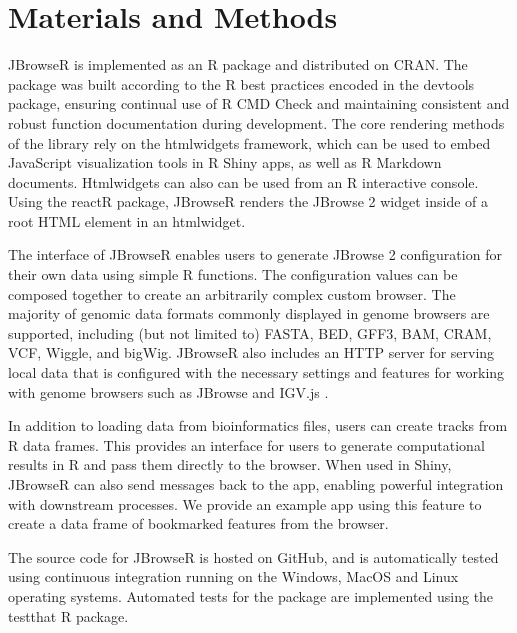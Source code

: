 \documentclass{bioinfo}
\begin{document}
\section{Materials and Methods}

JBrowseR is implemented as an R package and distributed on CRAN. The
package was built according to the R best practices encoded in the
devtools package, ensuring continual use of R CMD Check and maintaining
consistent and robust function documentation during development. The
core rendering methods of the library rely on the htmlwidgets framework,
which can be used to embed JavaScript visualization tools in R Shiny
apps, as well as R Markdown documents. Htmlwidgets can also can be used
from an R interactive console. Using the reactR package, JBrowseR
renders the JBrowse 2 widget inside of a root HTML element in an
htmlwidget.

The interface of JBrowseR enables users to generate JBrowse 2
configuration for their own data using simple R functions. The
configuration values can be composed together to create an arbitrarily
complex custom browser. The majority of genomic data formats commonly
displayed in genome browsers are supported, including (but not limited
to) FASTA, BED, GFF3, BAM, CRAM, VCF, Wiggle, and bigWig. JBrowseR also
includes an HTTP server for serving local data that is configured with
the necessary settings and features for working with genome browsers
such as JBrowse and IGV.js
\citep{robinson2011integrative, robinson2017variant}.

In addition to loading data from bioinformatics files, users can create
tracks from R data frames. This provides an interface for users to
generate computational results in R and pass them directly to the
browser. When used in Shiny, JBrowseR can also send messages back to the
app, enabling powerful integration with downstream processes. We provide
an example app using this feature to create a data frame of bookmarked
features from the browser.

The source code for JBrowseR is hosted on GitHub, and is automatically
tested using continuous integration running on the Windows, MacOS and
Linux operating systems. Automated tests for the package are implemented
using the testthat R package.
\end{document}
